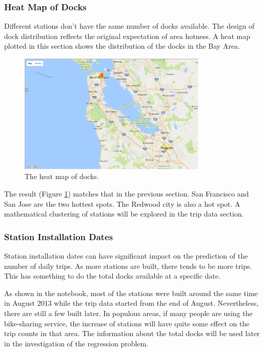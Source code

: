 \documentclass[a4paper]{article}
\begin{document}
			\subsubsection{Heat Map of Docks}
			Different stations don't have the same number of docks available. The design of dock distribution reflects the original expectation of area hotness. A heat map plotted in this section shows the distribution of the docks in the Bay Area.
			\begin{figure}
				\centering
				\includegraphics[width=0.8\textwidth]{Docks_HotMap.png}
				\caption{\label{fig:heatmap}The heat map of docks.}
			\end{figure}
			The result (Figure \ref{fig:heatmap}) matches that in the previous section. San Francisco and San Jose are the two hottest spots. The Redwood city is also a hot spot. A mathematical clustering of stations will be explored in the trip data section.
			
			\subsubsection{Station Installation Dates}
			Station installation dates can have significant impact on the prediction of the number of daily trips. As more stations are built, there tends to be more trips. This has something to do the total docks available at a specific date.
			
			As shown in the notebook, most of the stations were built around the same time in August 2013 while the trip data started from the end of August. Nevertheless, there are still a few built later. In populous areas, if many people are using the bike-sharing service, the increase of stations will have quite some effect on the trip counts in that area. The information about the total docks will be used later in the investigation of the regression problem.
\end{document}
